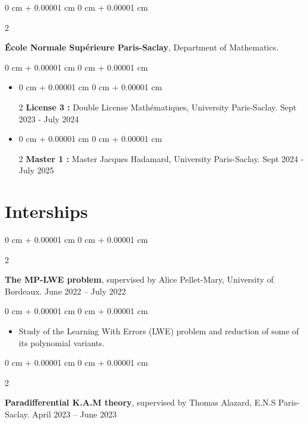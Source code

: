 \documentclass[10pt, letterpaper]{article}
\newenvironment{highlights}{
    \begin{itemize}[
        topsep=0.10 cm,
        parsep=0.10 cm,
        partopsep=0pt,
        itemsep=0pt,
        leftmargin=0 cm + 10pt
    ]
}{
    \end{itemize}
} %
\newenvironment{onecolentry}{
    \begin{adjustwidth}{
        0 cm + 0.00001 cm
    }{
        0 cm + 0.00001 cm
    }
}{
    \end{adjustwidth}
} %
\newenvironment{twocolentry}[2][]{
    \onecolentry
    \def\secondColumn{#2}
    \setcolumnwidth{\fill, 4.5 cm}
    \begin{paracol}{2}
}{
    \switchcolumn \raggedleft \secondColumn
    \end{paracol}
    \endonecolentry
} %
\begin{document}
		
		\vspace{0.2cm}
		
		
        \begin{twocolentry}{
        }
            \textbf{École Normale Supérieure Paris-Saclay}, Department of Mathematics. \end{twocolentry}
        \vspace{0.10 cm}
        \begin{onecolentry}
            \begin{highlights}
                \item \begin{twocolentry}{Sept 2023 - July 2024}\textbf{License 3 :} Double License Mathématiques, University Paris-Saclay. \end{twocolentry}
                \item \begin{twocolentry}{Sept 2024 - July 2025}\textbf{Master 1 :} Master Jacques Hadamard, University Paris-Saclay. \end{twocolentry}
            \end{highlights}
        \end{onecolentry}


    
    \section{Interships}



        
        \begin{twocolentry}{
            June 2022 – July 2022
        }
            \textbf{The MP-LWE problem}, supervised by Alice Pellet-Mary, University of Bordeaux. \end{twocolentry}

        \vspace{0.10 cm}
        \begin{onecolentry}
            \begin{highlights}
                \item Study of the Learning With Errors (LWE) problem and reduction of some of its polynomial variants.
            \end{highlights}
        \end{onecolentry}


        \vspace{0.2 cm}

        \begin{twocolentry}{
            April 2023 – June 2023
        }
            \textbf{Paradifferential K.A.M theory}, supervised by Thomas Alazard, E.N.S Paris-Saclay. \end{twocolentry}
\end{document}
